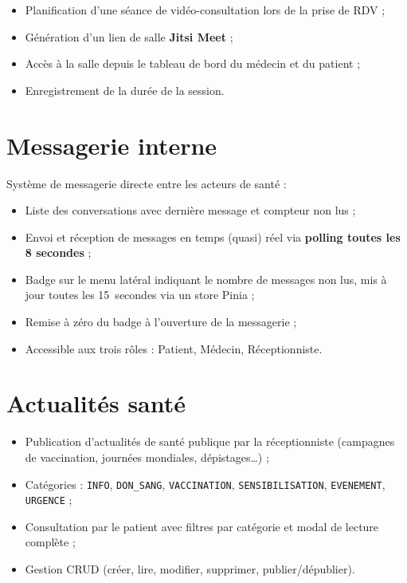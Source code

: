 \documentclass[12pt, a4paper]{report}
\begin{document}
\begin{itemize}
  \item Planification d'une séance de vidéo-consultation lors de la prise
        de RDV ;
  \item Génération d'un lien de salle \textbf{Jitsi Meet} ;
  \item Accès à la salle depuis le tableau de bord du médecin et du patient ;
  \item Enregistrement de la durée de la session.
\end{itemize}

\section{Messagerie interne}

Système de messagerie directe entre les acteurs de santé :
\begin{itemize}
  \item Liste des conversations avec dernière message et compteur non lus ;
  \item Envoi et réception de messages en temps (quasi) réel via
        \textbf{polling toutes les 8 secondes} ;
  \item Badge sur le menu latéral indiquant le nombre de messages non lus,
        mis à jour toutes les 15~secondes via un store Pinia ;
  \item Remise à zéro du badge à l'ouverture de la messagerie ;
  \item Accessible aux trois rôles : Patient, Médecin, Réceptionniste.
\end{itemize}

\section{Actualités santé}

\begin{itemize}
  \item Publication d'actualités de santé publique par la réceptionniste
        (campagnes de vaccination, journées mondiales, dépistages…) ;
  \item Catégories : \texttt{INFO}, \texttt{DON\_SANG}, \texttt{VACCINATION},
        \texttt{SENSIBILISATION}, \texttt{EVENEMENT}, \texttt{URGENCE} ;
  \item Consultation par le patient avec filtres par catégorie et modal
        de lecture complète ;
  \item Gestion CRUD (créer, lire, modifier, supprimer, publier/dépublier).
\end{itemize}
\end{document}
